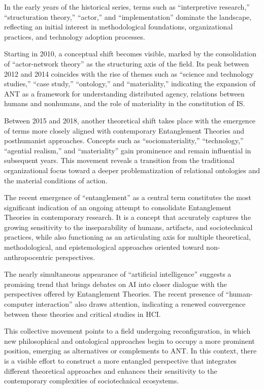 In the early years of the historical series, terms such as ``interpretive research,'' ``structuration theory,'' ``actor,'' and ``implementation'' dominate the landscape, reflecting an initial interest in methodological foundations, organizational practices, and technology adoption processes.

Starting in 2010, a conceptual shift becomes visible, marked by the consolidation of ``actor-network theory'' as the structuring axis of the field. Its peak between 2012 and 2014 coincides with the rise of themes such as ``science and technology studies,'' ``case study,'' ``ontology,'' and ``materiality,'' indicating the expansion of ANT as a framework for understanding distributed agency, relations between humans and nonhumans, and the role of materiality in the constitution of IS.

Between 2015 and 2018, another theoretical shift takes place with the emergence of terms more closely aligned with contemporary Entanglement Theories and posthumanist approaches. Concepts such as ``sociomateriality,'' ``technology,'' ``agential realism,'' and ``materiality'' gain prominence and remain influential in subsequent years. This movement reveals a transition from the traditional organizational focus toward a deeper problematization of relational ontologies and the material conditions of action.

The recent emergence of ``entanglement'' as a central term constitutes the most significant indication of an ongoing attempt to consolidate Entanglement Theories in contemporary research. It is a concept that accurately captures the growing sensitivity to the inseparability of humans, artifacts, and sociotechnical practices, while also functioning as an articulating axis for multiple theoretical, methodological, and epistemological approaches oriented toward non-anthropocentric perspectives.

The nearly simultaneous appearance of ``artificial intelligence'' suggests a promising trend that brings debates on AI into closer dialogue with the perspectives offered by Entanglement Theories. The recent presence of ``human-computer interaction'' also draws attention, indicating a renewed convergence between these theories and critical studies in HCI.

This collective movement points to a field undergoing reconfiguration, in which new philosophical and ontological approaches begin to occupy a more prominent position, emerging as alternatives or complements to ANT. In this context, there is a visible effort to construct a more entangled perspective that integrates different theoretical approaches and enhances their sensitivity to the contemporary complexities of sociotechnical ecosystems.



